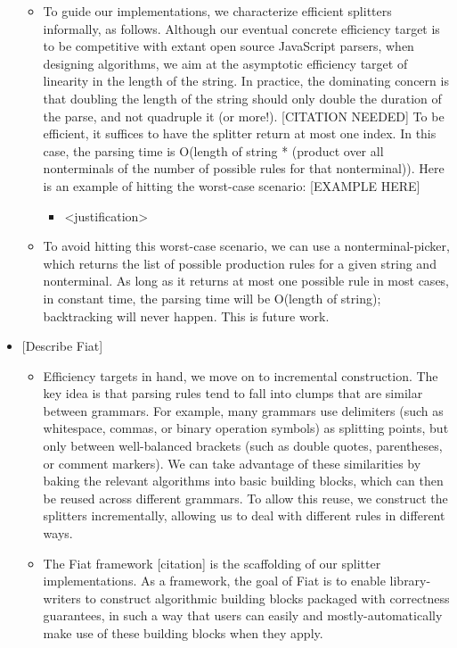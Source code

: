 \begin{itemize}
    \begin{itemize} \item  To guide our implementations, we characterize efficient splitters informally, as follows.  Although our eventual concrete efficiency target is to be competitive with extant open source JavaScript parsers, when designing algorithms, we aim at the asymptotic efficiency target of linearity in the length of the string.  In practice, the dominating concern is that doubling the length of the string should only double the duration of the parse, and not quadruple it (or more!).  {}[CITATION NEEDED]  To be efficient, it suffices to have the splitter return at most one index.  In this case, the parsing time is O(length of string * (product over all nonterminals of the number of possible rules for that nonterminal)). Here is an example of hitting the worst-case scenario: {}[EXAMPLE HERE] 
      \begin{itemize} \item  <justification> \end{itemize} 
    \item  To avoid hitting this worst-case scenario, we can use a nonterminal-picker, which returns the list of possible production rules for a given string and nonterminal.  As long as it returns at most one possible rule in most cases, in constant time, the parsing time will be O(length of string); backtracking will never happen.  This is future work. \end{itemize}
  \item  {}[Describe Fiat]
    \begin{itemize} \item  Efficiency targets in hand, we move on to incremental construction.  The key idea is that parsing rules tend to fall into clumps that are similar between grammars.  For example, many grammars use delimiters (such as whitespace, commas, or binary operation symbols) as splitting points, but only between well-balanced brackets (such as double quotes, parentheses, or comment markers).  We can take advantage of these similarities by baking the relevant algorithms into basic building blocks, which can then be reused across different grammars.  To allow this reuse, we construct the splitters incrementally, allowing us to deal with different rules in different ways. 
    \item  The Fiat framework {}[citation] is the scaffolding of our splitter implementations.  As a framework, the goal of Fiat is to enable library-writers to construct algorithmic building blocks packaged with correctness guarantees, in such a way that users can easily and mostly-automatically make use of these building blocks when they apply. 

\end{itemize}
\end{itemize}
